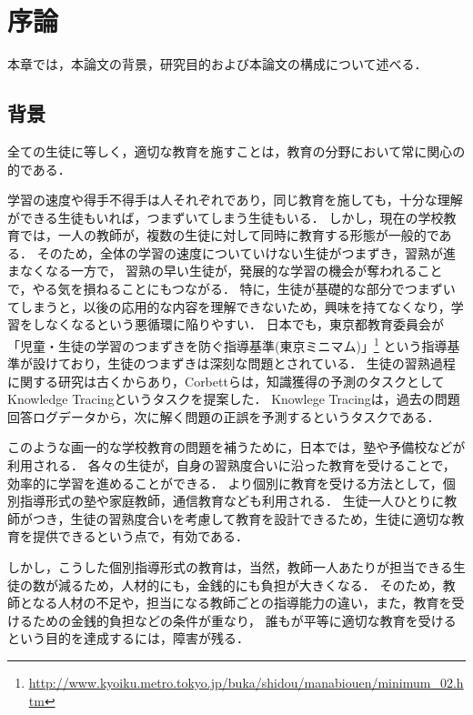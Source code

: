 \chapter{序論}
\label{chap:intro}
\fancyhf{}
\rhead{\thepage}
\cfoot{\thepage}

本章では，本論文の背景，研究目的および本論文の構成について述べる．


\section{背景}

全ての生徒に等しく，適切な教育を施すことは，教育の分野において常に関心の的である．

学習の速度や得手不得手は人それぞれであり，同じ教育を施しても，十分な理解ができる生徒もいれば，つまずいてしまう生徒もいる．
しかし，現在の学校教育では，一人の教師が，複数の生徒に対して同時に教育する形態が一般的である．
そのため，全体の学習の速度についていけない生徒がつまずき，習熟が進まなくなる一方で，
習熟の早い生徒が，発展的な学習の機会が奪われることで，やる気を損ねることにもつながる．
特に，生徒が基礎的な部分でつまずいてしまうと，以後の応用的な内容を理解できないため，興味を持てなくなり，学習をしなくなるという悪循環に陥りやすい．
日本でも，東京都教育委員会が
「児童・生徒の学習のつまずきを防ぐ指導基準(東京ミニマム)」\footnote{\url{http://www.kyoiku.metro.tokyo.jp/buka/shidou/manabiouen/minimum_02.htm}}
という指導基準が設けており，生徒のつまずきは深刻な問題とされている．
生徒の習熟過程に関する研究は古くからあり，Corbettらは，知識獲得の予測のタスクとしてKnowledge Tracingというタスクを提案した．
Knowlege Tracingは，過去の問題回答ログデータから，次に解く問題の正誤を予測するというタスクである．



このような画一的な学校教育の問題を補うために，日本では，塾や予備校などが利用される．
各々の生徒が，自身の習熟度合いに沿った教育を受けることで，効率的に学習を進めることができる．
より個別に教育を受ける方法として，個別指導形式の塾や家庭教師，通信教育なども利用される．
生徒一人ひとりに教師がつき，生徒の習熟度合いを考慮して教育を設計できるため，生徒に適切な教育を提供できるという点で，有効である．


しかし，こうした個別指導形式の教育は，当然，教師一人あたりが担当できる生徒の数が減るため，人材的にも，金銭的にも負担が大きくなる．
そのため，教師となる人材の不足や，担当になる教師ごとの指導能力の違い，また，教育を受けるための金銭的負担などの条件が重なり，
誰もが平等に適切な教育を受けるという目的を達成するには，障害が残る．


